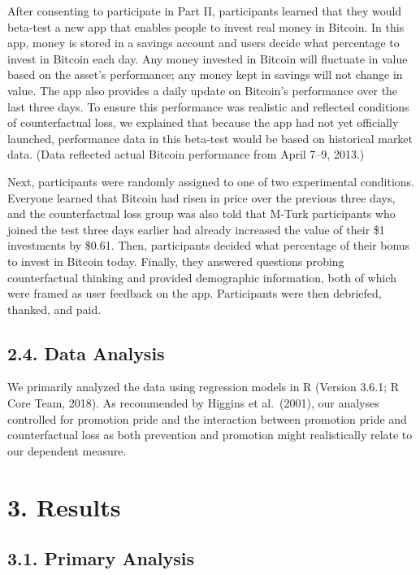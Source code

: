 \documentclass[man,floatsintext]{apa6}
\begin{document}
After consenting to participate in Part II, participants learned that they would beta-test a new app that enables people to invest real money in Bitcoin. In this app, money is stored in a savings account and users decide what percentage to invest in Bitcoin each day. Any money invested in Bitcoin will fluctuate in value based on the asset's performance; any money kept in savings will not change in value. The app also provides a daily update on Bitcoin's performance over the last three days. To ensure this performance was realistic and reflected conditions of counterfactual loss, we explained that because the app had not yet officially launched, performance data in this beta-test would be based on historical market data. (Data reflected actual Bitcoin performance from April 7--9, 2013.)

Next, participants were randomly assigned to one of two experimental conditions. Everyone learned that Bitcoin had risen in price over the previous three days, and the counterfactual loss group was also told that M-Turk participants who joined the test three days earlier had already increased the value of their \$1 investments by \$0.61. Then, participants decided what percentage of their bonus to invest in Bitcoin today. Finally, they answered questions probing counterfactual thinking and provided demographic information, both of which were framed as user feedback on the app. Participants were then debriefed, thanked, and paid.

\hypertarget{data-analysis}{%
\subsection{2.4. Data Analysis}\label{data-analysis}}

We primarily analyzed the data using regression models in R (Version 3.6.1; R Core Team, 2018). As recommended by Higgins et al.~(2001), our analyses controlled for promotion pride and the interaction between promotion pride and counterfactual loss as both prevention and promotion might realistically relate to our dependent measure.

\hypertarget{results}{%
\section{3. Results}\label{results}}

\hypertarget{primary-analysis}{%
\subsection{3.1. Primary Analysis}\label{primary-analysis}}
\end{document}
